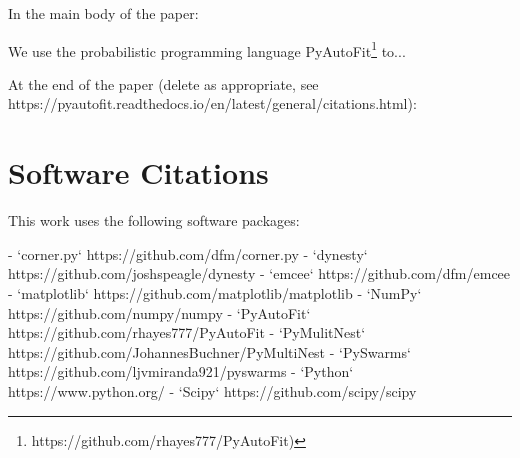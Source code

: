 In the main body of the paper:

We use the probabilistic programming language PyAutoFit\footnote{https://github.com/rhayes777/PyAutoFit)} \citep{pyautofit} to...

At the end of the paper (delete as appropriate, see https://pyautofit.readthedocs.io/en/latest/general/citations.html):

\section{Software Citations}

This work uses the following software packages:

- `corner.py` https://github.com/dfm/corner.py \citep{corner}
- `dynesty` https://github.com/joshspeagle/dynesty \citep{dynesty}
- `emcee` https://github.com/dfm/emcee \citep{emcee}
- `matplotlib` https://github.com/matplotlib/matplotlib \citep{matplotlib}
- `NumPy` https://github.com/numpy/numpy \citep{numpy}
- `PyAutoFit` https://github.com/rhayes777/PyAutoFit \citep{pyautofit}
- `PyMulitNest` https://github.com/JohannesBuchner/PyMultiNest \citep{multinest} \citep{pymultinest}
- `PySwarms` https://github.com/ljvmiranda921/pyswarms \citep{pyswarms}
- `Python` https://www.python.org/ \citep{python}
- `Scipy` https://github.com/scipy/scipy \citep{scipy}